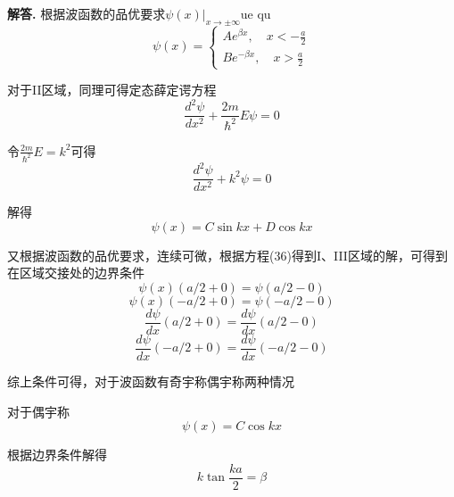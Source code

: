 \documentclass[12pt, a4paper, oneside]{ctexart}
\newenvironment{solution}{\par\noindent\textbf{解答. }}{\\\par}
\begin{document}
\begin{solution}
        根据波函数的品优要求$\psi(x)|_{x \to \pm \infty}$ue qu
        \begin{equation}
            \psi(x) = 
            \begin{cases}
                Ae^{\beta x},\quad x < -\frac a 2 \\
                Be^{-\beta x} ,\quad x > \frac a 2
                \end{cases}
        \end{equation}

        对于II区域，同理可得定态薛定谔方程
        \begin{equation}
            \frac{d^2 \psi}{dx^2}+\frac{2m}{\hbar^2}E\psi=0
        \end{equation}

        令$\frac{2m}{\hbar^2}E = k^2$可得
        \begin{equation}
            \frac{d^2 \psi}{dx^2}+k^2\psi=0
        \end{equation}

        解得
        \begin{equation}
            \psi(x)=C\sin{k x}+D\cos{k x}
        \end{equation}

        又根据波函数的品优要求，连续可微，根据方程(36)得到I、III区域的解，可得到在区域交接处的边界条件
        \begin{equation}
            \psi(x)(a/2+0)=\psi(a/2-0)
        \end{equation}
        \begin{equation}
            \psi(x)(-a/2+0)=\psi(-a/2-0)
        \end{equation}
        \begin{equation}
            \frac{d\psi}{dx}(a/2+0)=\frac{d\psi}{dx}(a/2-0)
        \end{equation}
        \begin{equation}
            \frac{d\psi}{dx}(-a/2+0)=\frac{d\psi}{dx}(-a/2-0)
        \end{equation}

        综上条件可得，对于波函数有奇宇称偶宇称两种情况

        对于偶宇称
            \begin{equation}
                \psi(x)=C\cos kx
            \end{equation}
            
        根据边界条件解得
            \begin{equation}
                k\tan \frac{ka}2 = \beta
            \end{equation}


\end{solution}
\end{document}
